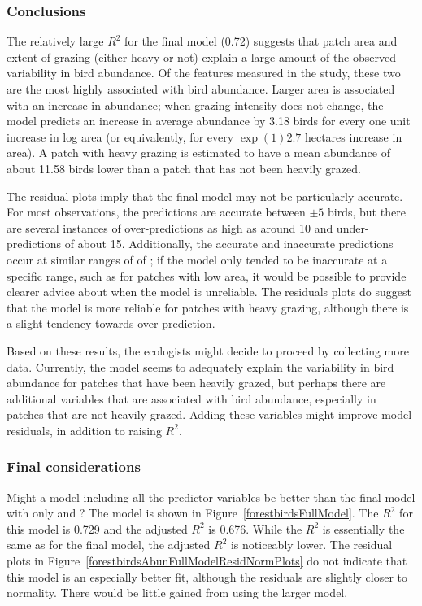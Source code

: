 \subsubsection{Conclusions}

The relatively large $R^2$ for the final model (0.72) suggests that patch area and extent of grazing (either heavy or not) explain a large amount of the observed variability in bird abundance. Of the features measured in the study, these two are the most highly associated with bird abundance. Larger area is associated with an increase in abundance; when grazing intensity does not change, the model predicts an increase in average abundance by 3.18 birds for every one unit increase in log area (or equivalently, for every $\exp(1) 2.7$ hectares increase in area). A patch with heavy grazing is estimated to have a mean abundance of about 11.58 birds lower than a patch that has not been heavily grazed. 

The residual plots imply that the final model may not be particularly accurate. For most observations, the predictions are accurate between $\pm 5$ birds, but there are several instances of over-predictions as high as around 10 and under-predictions of about 15. Additionally, the accurate and inaccurate predictions occur at similar ranges of of ; if the model only tended to be inaccurate at a specific range, such as for patches with low area, it would be possible to provide clearer advice about when the model is unreliable. The residuals plots do suggest that the model is more reliable for patches with heavy grazing, although there is a slight tendency towards over-prediction.

Based on these results, the ecologists might decide to proceed by collecting more data. Currently, the model seems to adequately explain the variability in bird abundance for patches that have been heavily grazed, but perhaps there are additional variables that are associated with bird abundance, especially in patches that are not heavily grazed. Adding these variables might improve model residuals, in addition to raising $R^2$. 


\subsubsection{Final considerations}

Might a model including all the predictor variables be better than the final model with only  and ? The model is shown in Figure~\ref{forestbirdsFullModel}. The $R^2$ for this model is 0.729 and the adjusted $R^2$ is 0.676. While the $R^2$ is essentially the same as for the final model, the adjusted $R^2$ is noticeably lower. The residual plots in Figure~\ref{forestbirdsAbunFullModelResidNormPlots} do not indicate that this model is an especially better fit, although the residuals are slightly closer to normality. There would be little gained from using the larger model.

